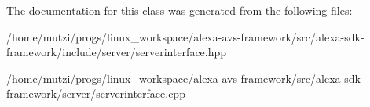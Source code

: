 The documentation for this class was generated from the following files\+:\begin{DoxyCompactItemize}
\item 
/home/mutzi/progs/linux\+\_\+workspace/alexa-\/avs-\/framework/src/alexa-\/sdk-\/framework/include/server/serverinterface.\+hpp\item 
/home/mutzi/progs/linux\+\_\+workspace/alexa-\/avs-\/framework/src/alexa-\/sdk-\/framework/server/serverinterface.\+cpp\end{DoxyCompactItemize}

